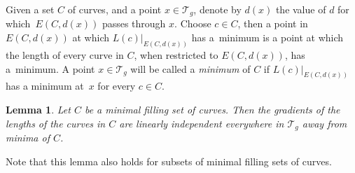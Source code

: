\documentclass[11pt]{article}
\numberwithin{equation}{section}
\numberwithin{equation}{section}
\newtheorem{Lemma}[Theorem]{Lemma}
\begin{document}
Given a set $C$ of curves, and a point $x\in \mathcal{T}_{g}$, denote by $d(x)$ the value of $d$ for which~$E(C,d(x))$ passes through $x$. Choose $c\in C$, then a point in $E(C,d(x))$ at which $L(c)|_{E(C,d(x))}$ has a~minimum is a point at which the length of every curve in $C$, when restricted to $E(C,d(x))$, has a~minimum. A point $x\in \mathcal{T}_{g}$ will be called a \textit{minimum} of $C$ if $L(c)|_{E(C,d(x))}$ has a minimum at~$x$ for every $c\in C$.

\begin{Lemma}
\label{polyhedronargument}
Let $C$ be a minimal filling set of curves. Then the gradients of the lengths of the curves in $C$ are linearly independent everywhere in $\mathcal{T}_{g}$ away from minima of $C$.
\end{Lemma}
\begin{Remark}
Note that this lemma also holds for subsets of minimal filling sets of curves.
\end{Remark}
\end{document}
